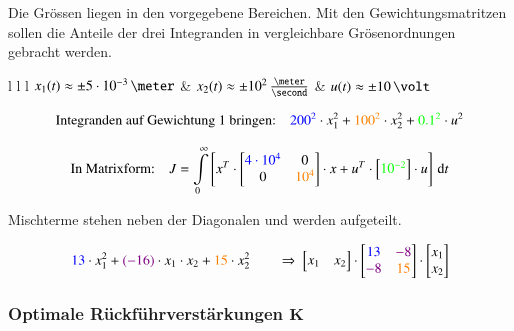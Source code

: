 
Die Grössen liegen in den vorgegebene Bereichen.
Mit den Gewichtungsmatritzen sollen die Anteile der drei Integranden in vergleichbare Grösenordnungen gebracht werden.

\begin{ctabular}{l l l}
    \tabitem $x_1(t) \approx \pm 5 \cdot 10^{-3} \, \meter$         &
    \tabitem $x_2(t) \approx \pm 10^{2} \, \frac{\meter}{\second}$  &
    \tabitem $u(t) \approx \pm 10 \, \volt$
\end{ctabular}

\vspace{-0.3cm}

$$ \text{Integranden auf Gewichtung 1 bringen:} \quad {\color{blue}200^2} \cdot x_1^2 + {\color{orange}100^2} \cdot x_2^2 + {\color{green}0.1^2} \cdot u^2 $$

\vspace{-0.3cm}

\[
    \text{In Matrixform:} \quad 
    J = \int\limits_{0}^{\infty} \left[ x^T \cdot
    \begin{bmatrix}
        {\color{blue}4 \cdot 10^4}  & 0         \\
        0                   & {\color{orange}10^4} 
    \end{bmatrix}
    \cdot x + u^T \cdot
    \begin{bmatrix}
        {\color{green}10^{-2}}
    \end{bmatrix}
    \cdot u \right] \, \mathop{} \! \mathrm{d} t
\]



Mischterme stehen neben der Diagonalen und werden aufgeteilt.

\vspace{-0.2cm}
\[
    {\color{blue}13} \cdot x_1^2 + {\color{violet}(-16)} \cdot x_1 \cdot x_2 + {\color{orange}15} \cdot x_2^2
    \qquad 
    \Rightarrow\
    \begin{bmatrix}
        x_1 & x_2
    \end{bmatrix}
    \cdot
    \begin{bmatrix}
        {\color{blue}13}    & {\color{violet}-8}  \\
        {\color{violet}-8}    & {\color{orange}15}
    \end{bmatrix}
    \cdot
    \begin{bmatrix}
        x_1 \\ x_2
    \end{bmatrix}
\]


\subsubsection{Optimale Rückführverstärkungen $\bm{K}$}

